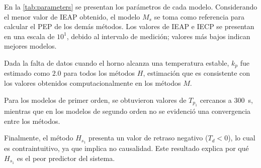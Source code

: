 En la \cref{tab:parameters} se presentan los parámetros de cada modelo.
Considerando el menor valor de IEAP obtenido, el modelo \(M_s\) se toma como
referencia para calcular el PEP de los demás métodos.
Los valores de IEAP e IECP se presentan en una escala de \(10^1\),
debido al intervalo de medición;
valores más bajos indican mejores modelos.

Dada la falta de datos cuando el horno alcanza una temperatura estable,
\(k_p\) fue estimado como \(2.0\) para todos los métodos \(H\),
estimación que es consistente con los valores obtenidos computacionalmente
en los métodos \(M\).

Para los modelos de primer orden, se obtuvieron valores de \(T_{p_1}\)
cercanos a \qty{300}{\s},
mientras que en los modelos de segundo orden no se evidenció una convergencia
entre los métodos.

Finalmente, el método \(H_{s_1}\) presenta un valor de retraso negativo (\(T_d < 0\)),
lo cual es contraintuitivo, ya que implica no causalidad.
Este resultado explica por qué \(H_{s_1}\) es el peor predictor del sistema.
